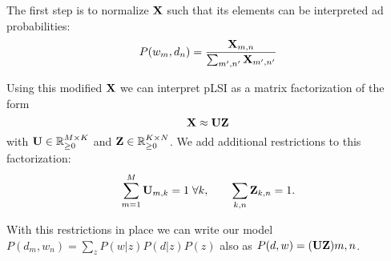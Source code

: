 The first step is to normalize \(\boldsymbol{\mathrm{X}}\) such that its elements can be interpreted ad probabilities:
\[
P(w_m, d_n) = \frac{\boldsymbol{\mathrm{X}}_{m, n}}{\sum_{m', n'} \boldsymbol{\mathrm{X}}_{m', n'}}
\]

Using this modified \(\boldsymbol{\mathrm{X}}\) we can interpret pLSI as a matrix factorization of the form
\[
\boldsymbol{\mathrm{X}} \approx \boldsymbol{\mathrm{UZ}}
\]
with \(\boldsymbol{\mathrm{U}} \in \mathbb{R}_{\geq 0}^{M \times K}\) and \(\boldsymbol{\mathrm{Z}} \in \mathbb{R}_{\geq 0}^{K \times N}\). We add additional restrictions to this factorization:
\[
\sum_{m=1}^M \boldsymbol{\mathrm{U}}_{m, k} = 1 \; \forall k, \quad\quad \sum_{k, n} \boldsymbol{\mathrm{Z}}_{k,n} = 1.
\]

With this restrictions in place we can write our model \(P(d_m, w_n) = \sum_z P(w|z)P(d|z)P(z)\) also as \(P(d, w) = (\boldsymbol{\mathrm{UZ}}){m, n}\).


